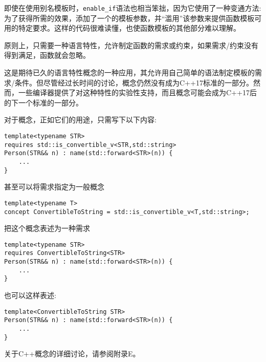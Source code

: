 即使在使用别名模板时，\texttt{enable\_if}语法也相当笨拙，因为它使用了一种变通方法:为了获得所需的效果，添加了一个的模板参数，并“滥用”该参数来提供函数模板可用的特定要求。这样的代码很难读懂，也使函数模板的其他部分难以理解。

原则上，只需要一种语言特性，允许制定函数的需求或约束，如果需求/约束没有得到满足，函数就会忽略。

这是期待已久的语言特性概念的一种应用，其允许用自己简单的语法制定模板的需求/条件。但尽管经过长时间的讨论，概念仍然没有成为C++17标准的一部分。然而，一些编译器提供了对这种特性的实验性支持，而且概念可能会成为C++17后的下一个标准的一部分。

对于概念，正如它们的用途，只需写下以下内容:

\begin{lstlisting}[style=styleCXX]
template<typename STR>
requires std::is_convertible_v<STR,std::string>
Person(STR&& n) : name(std::forward<STR>(n)) {
	...
}
\end{lstlisting}

甚至可以将需求指定为一般概念

\begin{lstlisting}[style=styleCXX]
template<typename T>
concept ConvertibleToString = std::is_convertible_v<T,std::string>;
\end{lstlisting}

把这个概念表述为一种需求

\begin{lstlisting}[style=styleCXX]
template<typename STR>
requires ConvertibleToString<STR>
Person(STR&& n) : name(std::forward<STR>(n)) {
	...
}
\end{lstlisting}

也可以这样表述:

\begin{lstlisting}[style=styleCXX]
template<ConvertibleToString STR>
Person(STR&& n) : name(std::forward<STR>(n)) {
	...
}
\end{lstlisting}

关于C++概念的详细讨论，请参阅附录E。




















